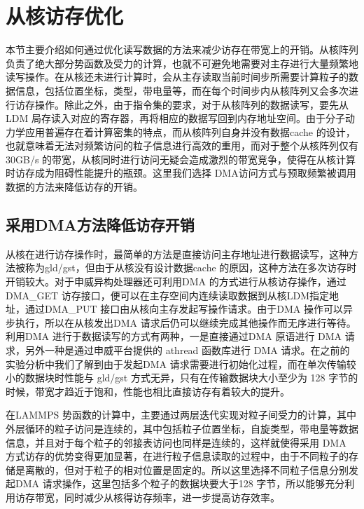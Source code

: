 \section{从核访存优化}
本节主要介绍如何通过优化读写数据的方法来减少访存在带宽上的开销。从核阵列负责了绝大部分势函数及受力的计算，也就不可避免地需要对主存进行大量频繁地读写操作。在从核还未进行计算时，会从主存读取当前时间步所需要计算粒子的数据信息，包括位置坐标，类型，带电量等，而在每个时间步内从核阵列又会多次进行访存操作。除此之外，由于指令集的要求，对于从核阵列的数据读写，要先从LDM 局存读入对应的寄存器，再将相应的数据写回到内存地址空间。由于分子动力学应用普遍存在着计算密集的特点，而从核阵列自身并没有数据cache 的设计，也就意味着无法对频繁访问的粒子信息进行高效的重用，而对于整个从核阵列仅有 30GB/s 的带宽，从核同时进行访问无疑会造成激烈的带宽竞争，使得在从核计算时访存成为阻碍性能提升的瓶颈。这里我们选择 DMA访问方式与预取频繁被调用数据的方法来降低访存的开销。

\subsection{采用DMA方法降低访存开销}
从核在进行访存操作时，最简单的方法是直接访问主存地址进行数据读写，这种方法被称为gld/gst，但由于从核没有设计数据cache 的原因，这种方法在多次访存时开销较大。对于申威异构处理器还可利用DMA 的方式进行从核访存操作，通过DMA\_GET 访存接口，便可以在主存空间内连续读取数据到从核LDM指定地址，通过DMA\_PUT 接口由从核向主存发起写操作请求。由于DMA 操作可以异步执行，所以在从核发出DMA 请求后仍可以继续完成其他操作而无序进行等待。利用DMA 进行于数据读写的方式有两种，一是直接通过DMA 原语进行 DMA 请求，另外一种是通过申威平台提供的 athread 函数库进行 DMA 请求。在之前的实验分析中我们了解到由于发起DMA 请求需要进行初始化过程，而在单次传输较小的数据块时性能与 gld/gst 方式无异，只有在传输数据块大小至少为 128 字节的时候，带宽才趋近于饱和，性能也相比直接访存有着较大的提升。

在LAMMPS 势函数的计算中，主要通过两层迭代实现对粒子间受力的计算，其中外层循环的粒子访问是连续的，其中包括粒子位置坐标，自旋类型，带电量等数据信息，并且对于每个粒子的邻接表访问也同样是连续的，这样就使得采用 DMA 方式访存的优势变得更加显著，在进行粒子信息读取的过程中，由于不同粒子的存储是离散的，但对于粒子的相对位置是固定的。所以这里选择不同粒子信息分别发起DMA 请求操作，这里包括多个粒子的数据块要大于128 字节，所以能够充分利用访存带宽，同时减少从核得访存频率，进一步提高访存效率。


